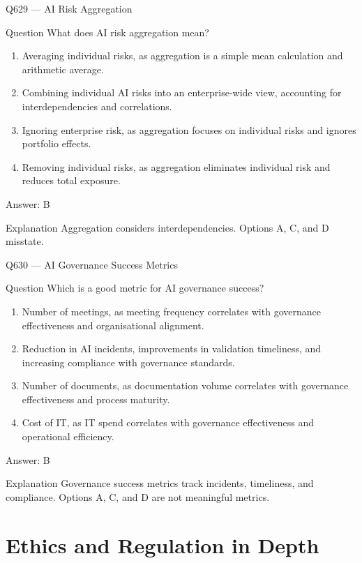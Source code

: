 \documentclass[aspectratio=169,8pt]{beamer}
\begin{document}
	\begin{frame}{Q629 --- AI Risk Aggregation}
		\begin{block}{Question}
			What does AI risk aggregation mean?
			\begin{enumerate}
				\item Averaging individual risks, as aggregation is a simple mean calculation and arithmetic average.
				\item Combining individual AI risks into an enterprise-wide view, accounting for interdependencies and correlations.
				\item Ignoring enterprise risk, as aggregation focuses on individual risks and ignores portfolio effects.
				\item Removing individual risks, as aggregation eliminates individual risk and reduces total exposure.
			\end{enumerate}
		\end{block}
		\begin{exampleblock}{Answer: B}\end{exampleblock}
		\begin{block}{Explanation}
			Aggregation considers interdependencies. Options A, C, and D misstate.
		\end{block}
	\end{frame}
	
	\begin{frame}{Q630 --- AI Governance Success Metrics}
		\begin{block}{Question}
			Which is a good metric for AI governance success?
			\begin{enumerate}
				\item Number of meetings, as meeting frequency correlates with governance effectiveness and organisational alignment.
				\item Reduction in AI incidents, improvements in validation timeliness, and increasing compliance with governance standards.
				\item Number of documents, as documentation volume correlates with governance effectiveness and process maturity.
				\item Cost of IT, as IT spend correlates with governance effectiveness and operational efficiency.
			\end{enumerate}
		\end{block}
		\begin{exampleblock}{Answer: B}\end{exampleblock}
		\begin{block}{Explanation}
			Governance success metrics track incidents, timeliness, and compliance. Options A, C, and D are not meaningful metrics.
		\end{block}
	\end{frame}
	
	\section{Ethics and Regulation in Depth}

	
	
\end{document}
